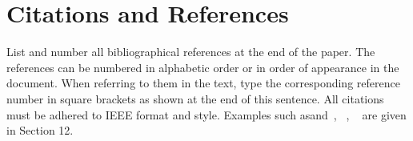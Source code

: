 \documentclass{article}
\begin{document}




\section{Citations and References}

List and number all bibliographical references at the end of the paper. The references can be numbered in alphabetic order or in order of appearance in the document. When referring to them in the text, type the corresponding reference number in square brackets as shown at the end of this sentence. All citations must be adhered to IEEE format and style. Examples such asand~\cite{kurose}, ~\cite{encryption}, ~\cite{clientserver} are given in Section 12.



\end{document}
